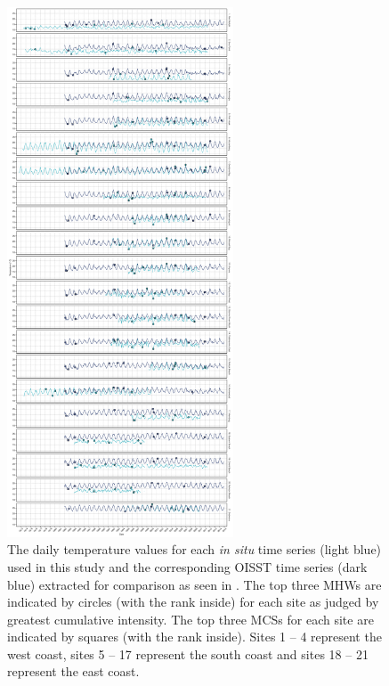 \documentclass[a4paper,10pt,review]{elsarticle}
\begin{document}
\begin{figure}
\centering \includegraphics[width=0.6\textwidth]{figure2.pdf}
\caption{The daily temperature values for each \emph{in situ} time series (light blue) used in this study and the corresponding OISST time series (dark blue) extracted for comparison as seen in . The top three MHWs are indicated by circles (with the rank inside) for each site as judged by greatest cumulative intensity. The top three MCSs for each site are indicated by squares (with the rank inside). Sites 1 -- 4 represent the west coast, sites 5 -- 17 represent the south coast and sites 18 -- 21 represent the east coast.} \label{fig:Figure2}
\end{figure}
\end{document}

